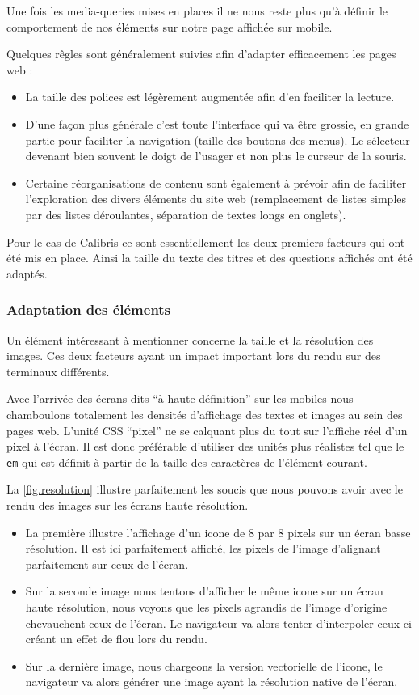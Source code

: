 \documentclass[12pt,a4paper]{book}
\begin{document}
Une fois les media-queries mises en places il ne nous reste plus qu'à définir le comportement de nos éléments sur notre page affichée sur mobile.

Quelques rêgles sont généralement suivies afin d'adapter efficacement les pages web :
\begin{itemize}
  \item La taille des polices est légèrement augmentée afin d'en faciliter la lecture.
  \item D'une façon plus générale c'est toute l'interface qui va être grossie, en grande partie pour faciliter la navigation (taille des boutons des menus). Le sélecteur devenant bien souvent le doigt de l'usager et non plus le curseur de la souris.
  \item Certaine réorganisations de contenu sont également à prévoir afin de faciliter l'exploration des divers éléments du site web (remplacement de listes simples par des listes déroulantes, séparation de textes longs en onglets).
\end{itemize}

Pour le cas de Calibris ce sont essentiellement les deux premiers facteurs qui ont été mis en place. Ainsi la taille du texte des titres et des questions affichés ont été adaptés.

\subsubsection{Adaptation des éléments}

Un élément intéressant à mentionner concerne la taille et la résolution des images. Ces deux facteurs ayant un impact important lors du rendu sur des terminaux différents.

Avec l'arrivée des écrans dits ``à haute définition'' sur les mobiles nous chamboulons totalement les densités d'affichage des textes et images au sein des pages web. L'unité CSS ``pixel'' ne se calquant plus du tout sur l'affiche réel d'un pixel à l'écran. Il est donc préférable d'utiliser des unités plus réalistes tel que le \texttt{em} qui est définit à partir de la taille des caractères de l'élément courant.

La \cref{fig.resolution} illustre parfaitement les soucis que nous pouvons avoir avec le rendu des images sur les écrans haute résolution. 

\begin{itemize}
  \item La première illustre l'affichage d'un icone de 8 par 8 pixels sur un écran basse résolution. Il est ici parfaitement affiché, les pixels de l'image d'alignant parfaitement sur ceux de l'écran.
  \item Sur la seconde image nous tentons d'afficher le même icone sur un écran haute résolution, nous voyons que les pixels agrandis de l'image d'origine chevauchent ceux de l'écran. Le navigateur va alors tenter d'interpoler ceux-ci créant un effet de flou lors du rendu.
  \item Sur la dernière image, nous chargeons la version vectorielle de l'icone, le navigateur va alors générer une image ayant la résolution native de l'écran.
\end{itemize}
\end{document}
